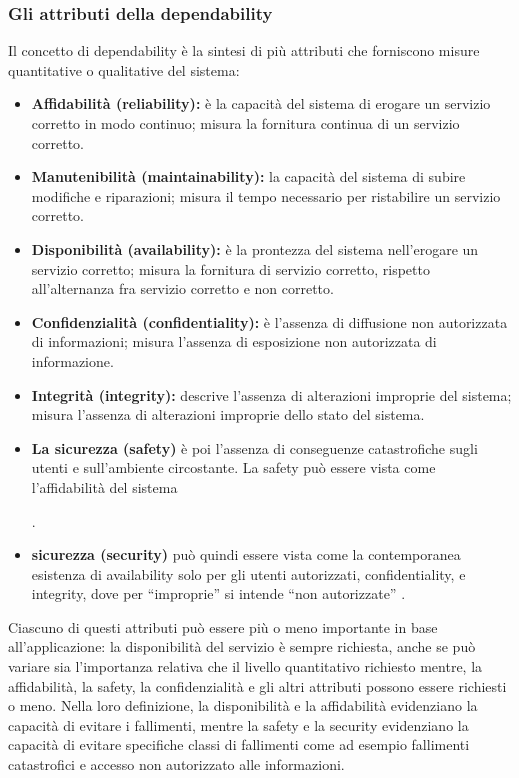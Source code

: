 \documentclass[14pt]{extarticle}
\begin{document}
\subsubsection{Gli attributi della dependability}
Il concetto di dependability è la sintesi di più attributi che forniscono misure
quantitative o qualitative del sistema:
\begin{itemize}
\item \textbf{Affidabilità (reliability):} è la capacità del sistema di erogare un servizio corretto in modo continuo; misura la fornitura continua di un servizio
corretto.
\item \textbf{Manutenibilità (maintainability):} la capacità del sistema di subire modifiche e riparazioni; misura il tempo necessario per ristabilire un servizio
corretto.
\item \textbf{Disponibilità (availability):} è la prontezza del sistema nell'erogare un
servizio corretto; misura la fornitura di servizio corretto, rispetto all'alternanza fra servizio corretto e non corretto.
\item \textbf{Confidenzialità (confidentiality):} è l'assenza di diffusione non autorizzata di informazioni; misura l'assenza di esposizione non autorizzata di
informazione.
\item \textbf{Integrità (integrity):} descrive l'assenza di alterazioni improprie del sistema; misura l’assenza di alterazioni improprie dello stato del sistema.

\item \textbf{La sicurezza (safety)} è poi l'assenza di conseguenze catastrofiche sugli
utenti e sull'ambiente circostante. La safety può essere vista come l'affidabilità
del sistema .
\item \textbf{sicurezza (security)} può quindi essere vista come la contemporanea esistenza di availability solo per gli utenti autorizzati, confidentiality, e
integrity, dove per “improprie” si intende “non autorizzate” \cite{nicol2004model}.
\end{itemize}
Ciascuno di questi attributi può essere più o meno importante in base all'applicazione: la disponibilità del servizio è sempre richiesta, anche se può
variare sia l'importanza relativa che il livello quantitativo richiesto mentre, la affidabilità, la safety, la confidenzialità e gli altri attributi possono essere richiesti
o meno. Nella loro definizione, la disponibilità e la affidabilità evidenziano la
capacità di evitare i fallimenti, mentre la safety e la security evidenziano la
capacità di evitare specifiche classi di fallimenti come ad esempio fallimenti
catastrofici e accesso non autorizzato alle informazioni.
\end{document}
